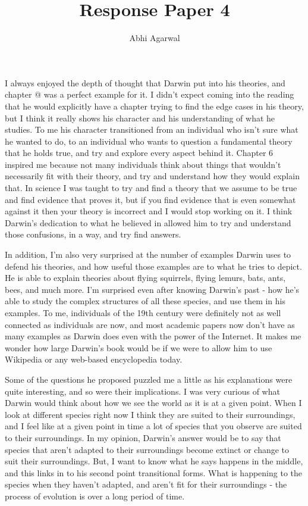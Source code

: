 \documentclass[11pt, oneside]{article}
\title{Response Paper 4}
\author{Abhi Agarwal}
\date{}
\makeatletter
\newcommand*{\rom}[1]{\expandafter\@slowromancap\romannumeral #1@}
\makeatother
\begin{document}
\maketitle

\par I always enjoyed the depth of thought that Darwin put into his theories, and chapter \rom{6} was a perfect example for it. I didn't expect coming into the reading that he would explicitly have a chapter trying to find the edge cases in his theory, but I think it really shows his character and his understanding of what he studies. To me his character transitioned from an individual who isn't sure what he wanted to do, to an individual who wants to question a fundamental theory that he holds true, and try and explore every aspect behind it. Chapter 6 inspired me because not many individuals think about things that wouldn't necessarily fit with their theory, and try and understand how they would explain that. In science I was taught to try and find a theory that we assume to be true and find evidence that proves it, but if you find evidence that is even somewhat against it then your theory is incorrect and I would stop working on it. I think Darwin's dedication to what he believed in allowed him to try and understand those confusions, in a way, and try find answers. 

\par In addition, I'm also very surprised at the number of examples Darwin uses to defend his theories, and how useful those examples are to what he tries to depict. He is able to explain theories about flying squirrels, flying lemurs, bats, ants, bees, and much more. I'm surprised even after knowing Darwin's past - how he's able to study the complex structures of all these species, and use them in his examples. To me, individuals of the 19th century were definitely not as well connected as individuals are now, and most academic papers now don't have as many examples as Darwin does even with the power of the Internet. It makes me wonder how large Darwin's book would be if we were to allow him to use Wikipedia or any web-based encyclopedia today. 

\par Some of the questions he proposed puzzled me a little as his explanations were quite interesting, and so were their implications. I was very curious of what Darwin would think about how we see the world as it is at a given point. When I look at different species right now I think they are suited to their surroundings, and I feel like at a given point in time a lot of species that you observe are suited to their surroundings. In my opinion, Darwin's answer would be to say that species that aren't adapted to their surroundings become extinct or change to suit their surroundings. But, I want to know what he says happens in the middle, and this links in to his second point transitional forms. What is happening to the species when they haven't adapted, and aren't fit for their surroundings - the process of evolution is over a long period of time.
\end{document}
